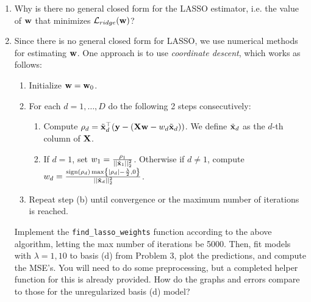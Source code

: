 \documentclass[submit]{harvardml}
\begin{document}
\begin{problem}
\begin{enumerate}
    \item Why is there no general closed form for the LASSO estimator, i.e. the value of $\mathbf{w}$ that minimizes $\mathcal{L}_{ridge}(\mathbf{w})$?

    \item Since there is no general closed form for LASSO, we use numerical methods for estimating $\mathbf{w}$. One approach is to use \textit{coordinate descent}, which works as follows: 
    \begin{enumerate}
        \item Initialize $\mathbf{w}=\mathbf{w}_0$.
        \item For each $d=1, \ldots, D$ do the following 2 steps consecutively:
        \begin{enumerate}
            \item Compute $\rho_d = \tilde{\mathbf{x}}_d^\top(\mathbf{y} - (\mathbf{X} \mathbf{w} - w_d \tilde{\mathbf{x}}_d))$. We define $\tilde{\mathbf{x}}_d$ as the $d$-th column of $\mathbf{X}$.

            \item If $d=1$, set $w_1 = \frac{\rho_1}{||\tilde{\mathbf{x}}_1||^2_2}$. Otherwise if $d\ne 1$, compute $w_d = \frac{\text{sign}(\rho_d)\max\left\{|\rho_d|-\frac{\lambda}{2}, 0\right\}}{||\tilde{\mathbf{x}}_d||^2_2}$.
        \end{enumerate}
        \item Repeat step (b) until convergence or the maximum number of iterations is reached.
    \end{enumerate} 

    Implement the \texttt{find\_lasso\_weights} function according to the above algorithm, letting the max number of iterations be 5000. Then, fit models with $\lambda=1, 10$ to basis (d) from Problem 3, plot the predictions, and compute the MSE's. You will need to do some preprocessing, but a completed helper function for this is already provided. How do the graphs and errors compare to those for the unregularized basis (d) model? 


\end{enumerate}

\end{problem}
\end{document}
